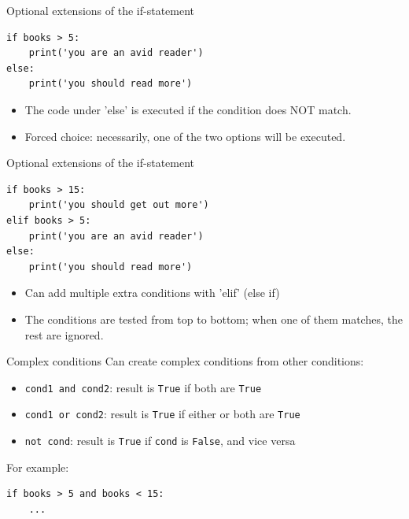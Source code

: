 \documentclass[aspectratio=169,usenames,dvipsnames]{beamer}
\begin{document}
\begin{frame}[fragile]{Optional extensions of the if-statement}
\begin{lstlisting}
if books > 5:
    print('you are an avid reader')
else:
    print('you should read more')
\end{lstlisting}

\begin{itemize}
    \item The code under 'else' is executed if the condition does NOT match.
    \item Forced choice: necessarily, one of the two options will be executed.
\end{itemize}
\end{frame}


\begin{frame}[fragile]{Optional extensions of the if-statement}
\begin{lstlisting}
if books > 15:
    print('you should get out more')
elif books > 5:
    print('you are an avid reader')
else:
    print('you should read more')
\end{lstlisting}

\begin{itemize}
    \item Can add multiple extra conditions with 'elif' (else if)
    \item The conditions are tested from top to bottom;
            when one of them matches, the rest are ignored.
\end{itemize}
\end{frame}


\begin{frame}[fragile]{Complex conditions}
    Can create complex conditions from other conditions:
    
    \begin{itemize}
        \item \lstinline{cond1 and cond2}:
            result is \lstinline{True} if both are \lstinline{True}
        \item \lstinline{cond1 or cond2}:
            result is \lstinline{True} if either or both are \lstinline{True}
        \item \lstinline{not cond}:
            result is \lstinline{True} if \lstinline{cond}
            is \lstinline{False}, and vice versa
    \end{itemize}

    \pause
    For example:
\begin{lstlisting}
if books > 5 and books < 15:
    ...
\end{lstlisting}

\end{frame}
\end{document}

